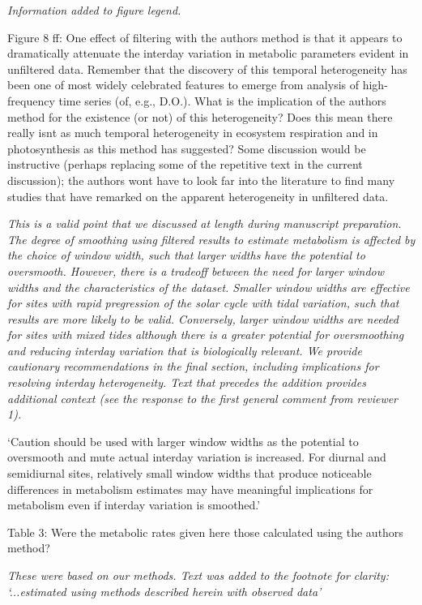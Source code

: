 \documentclass[letterpaper,12pt]{article}\usepackage[]{graphicx}\usepackage[]{color}
\begin{document}
{\it Information added to figure legend.}
 
Figure 8 ff: One effect of filtering with the authors method is that it appears to dramatically attenuate the interday variation in metabolic parameters evident in unfiltered data. Remember that the discovery of this temporal heterogeneity has been one of most widely celebrated features to emerge from analysis of high-frequency time series (of, e.g., D.O.). What is the implication of the authors method for the existence (or not) of this heterogeneity? Does this mean there really isnt as much temporal heterogeneity in ecosystem respiration and in photosynthesis as this method has suggested? Some discussion would be instructive (perhaps
replacing some of the repetitive text in the current discussion); the authors wont have to look far into the literature to find many studies that have remarked on the apparent heterogeneity in unfiltered data.

{\it This is a valid point that we discussed at length during manuscript preparation.  The degree of smoothing using filtered results to estimate metabolism is affected by the choice of window width, such that larger widths have the potential to oversmooth.  However, there is a tradeoff between the need for larger window widths and the characteristics of the dataset.  Smaller window widths are effective for sites with rapid pregression of the solar cycle with tidal variation, such that results are more likely to be valid.  Conversely, larger window widths are needed for sites with mixed tides although there is a greater potential for oversmoothing and reducing interday variation that is biologically relevant. We provide cautionary recommendations in the final section, including implications for resolving interday heterogeneity. Text that precedes the addition provides additional context (see the response to the first general comment from reviewer 1).

`Caution should be used with larger window widths as the potential to oversmooth and mute actual interday variation is increased.  For diurnal and semidiurnal sites, relatively small window widths that produce noticeable differences in metabolism estimates may have meaningful implications for metabolism even if interday variation is smoothed.'}

Table 3: Were the metabolic rates given here those calculated using the authors method?

{\it These were based on our methods.  Text was added to the footnote for clarity: `...estimated using methods described herein with observed data'}
\end{document}
